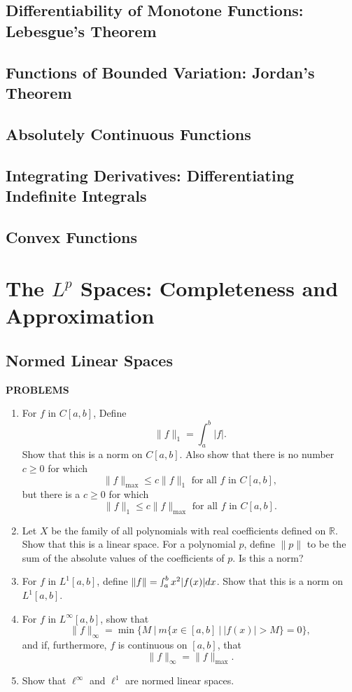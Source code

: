 \documentclass[a4paper,10pt]{book}
\theoremstyle{plain} %
\begin{document}
\section{Differentiability of Monotone Functions: Lebesgue's Theorem}
\section{Functions of Bounded Variation: Jordan's Theorem}
\section{Absolutely Continuous Functions}
\section{Integrating Derivatives: Differentiating Indefinite Integrals}
\section{Convex Functions}

\chapter{The $L^p$ Spaces: Completeness and Approximation}

\section{Normed Linear Spaces}
\begin{center}
	\textbf{PROBLEMS}
\end{center}
\begin{enumerate}
	\setcounter{enumi}{0}
	\item For $f$ in $C[a,b]$, Define
	\[
	\| f \|_1 = \int_a^b |f|.	
	\]
	Show that this is a norm on $C[a,b]$.
	Also show that there is no number $c \ge 0$ for which
	\[
	\| f \|_{\max}	\le c \| f \|_1 \text{ for all $f$ in $C[a,b]$},
	\]
	but there is a $c \ge 0$ for which 
	\[
	\| f \|_1	\le c \| f \|_{\max} \text{ for all $f$ in $C[a,b]$}.
	\]
	\item Let $X$ be the family of all polynomials with real coefficients defined on $\mathbb{R}$.
	Show that this is a linear space. For a polynomial $p$, define $\| p\|$ to be the sum of the absolute values of the coefficients of $p$.
	Is this a norm?
	\item For $f$ in $L^1[a,b]$, define $\|f\| = \smallint_a^b x^2 |f(x)|dx$.
	Show that this is a norm on $L^1[a,b]$.
	\item For $f$ in $L^\infty[a,b]$, show that 
	\[
	\| f\|_\infty = \min \biggl \{ M \ \biggl |\ m \{x \in [a,b]\ |\ |f(x)| > M \} =0 \biggr \},
	\] 
	and if, furthermore, $f$ is continuous on $[a,b]$, that
	\[
	\| f \|_{\infty} = \| f \|_{\max}.	
	\]
	\item Show that $\ell^\infty$ and $\ell^1$ are normed linear spaces.
\end{enumerate}
\end{document}
